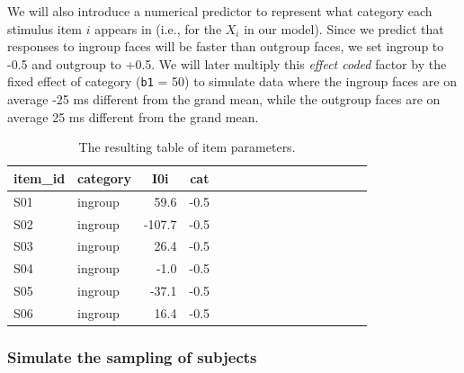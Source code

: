 \documentclass[doc,floatsintext]{apa6}
\newenvironment{Shaded}{\begin{snugshade}}{\end{snugshade}}
\newcommand{\KeywordTok}[1]{\textcolor[rgb]{0.13,0.29,0.53}{\textbf{#1}}}
\newcommand{\FloatTok}[1]{\textcolor[rgb]{0.00,0.00,0.81}{#1}}
\newcommand{\StringTok}[1]{\textcolor[rgb]{0.31,0.60,0.02}{#1}}
\newcommand{\CommentTok}[1]{\textcolor[rgb]{0.56,0.35,0.01}{\textit{#1}}}
\newcommand{\OperatorTok}[1]{\textcolor[rgb]{0.81,0.36,0.00}{\textbf{#1}}}
\newcommand{\NormalTok}[1]{#1}
\begin{document}
We will also introduce a numerical predictor to represent what category
each stimulus item \(i\) appears in (i.e., for the \(X_i\) in our
model). Since we predict that responses to ingroup faces will be faster
than outgroup faces, we set ingroup to -0.5 and outgroup to +0.5. We
will later multiply this \emph{effect coded} factor by the fixed effect
of category (\texttt{b1} = 50) to simulate data where the ingroup faces
are on average -25 ms different from the grand mean, while the outgroup
faces are on average 25 ms different from the grand mean.

\begin{Shaded}
\end{Shaded}

\begin{table}[H]
\begin{center}
\begin{threeparttable}
\caption{\label{tab:items-table}The resulting table of item parameters.}
\begin{tabular}{llrrllrrllrrllrr}
\toprule
item\_id & \multicolumn{1}{c}{category} & \multicolumn{1}{c}{I0i} & \multicolumn{1}{c}{cat}\\
\midrule
S01 & ingroup & 59.6 & -0.5\\
S02 & ingroup & -107.7 & -0.5\\
S03 & ingroup & 26.4 & -0.5\\
S04 & ingroup & -1.0 & -0.5\\
S05 & ingroup & -37.1 & -0.5\\
S06 & ingroup & 16.4 & -0.5\\
\bottomrule
\end{tabular}
\end{threeparttable}
\end{center}
\end{table}

\subsubsection{Simulate the sampling of
subjects}\label{simulate-the-sampling-of-subjects}
\end{document}
